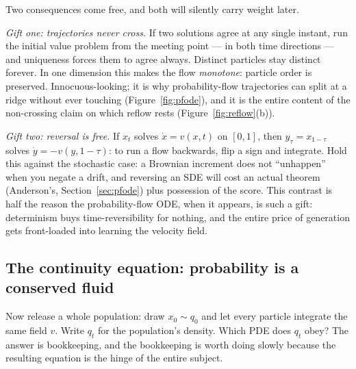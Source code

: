 \documentclass[10pt,a4paper]{article}
\begin{document}
Two consequences come free, and both will silently carry weight later.

\emph{Gift one: trajectories never cross.} If two solutions agree at any
single instant, run the initial value problem from the meeting point ---
in both time directions --- and uniqueness forces them to agree always.
Distinct particles stay distinct forever. In one dimension this makes
the flow \emph{monotone}: particle order is preserved. Innocuous-looking;
it is why probability-flow trajectories can split at a ridge without
ever touching (Figure~\ref{fig:pfode}), and it is the entire content of
the non-crossing claim on which reflow rests
(Figure~\ref{fig:reflow}(b)).

\emph{Gift two: reversal is free.} If $x_t$ solves $\dot x = v(x, t)$ on
$[0, 1]$, then $y_\tau = x_{1 - \tau}$ solves
$\dot y = -v(y, 1 - \tau)$: to run a flow backwards, flip a sign and
integrate. Hold this against the stochastic case: a Brownian increment
does not ``unhappen'' when you negate a drift, and reversing an SDE will
cost an actual theorem (Anderson's, Section~\ref{sec:pfode}) plus
possession of the score. This contrast is half the reason the
probability-flow ODE, when it appears, is such a gift: determinism buys
time-reversibility for nothing, and the entire price of generation gets
front-loaded into learning the velocity field.

\subsection{The continuity equation: probability is a conserved fluid}
\label{sec:continuity}

Now release a whole population: draw $x_0 \sim q_0$ and let every
particle integrate the same field $v$. Write $q_t$ for the population's
density. Which PDE does $q_t$ obey? The answer is bookkeeping, and the
bookkeeping is worth doing slowly because the resulting equation is the
hinge of the entire subject.
\end{document}
